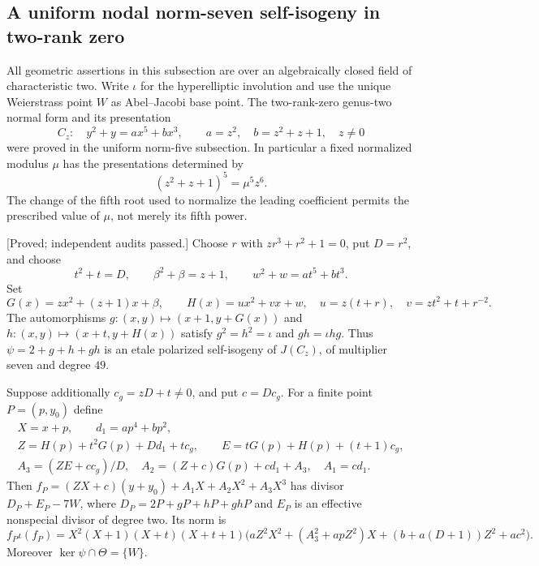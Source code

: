 \subsection{A uniform nodal norm-seven self-isogeny in two-rank zero}
\label{subsec:uniform-seven-theta-candidate}

All geometric assertions in this subsection are over an algebraically
closed field of characteristic two. Write $\iota$ for the hyperelliptic
involution and use the unique Weierstrass point $W$ as Abel--Jacobi base
point. The two-rank-zero genus-two normal form and its presentation
\[
 C_z:\quad y^2+y=ax^5+bx^3,\qquad
 a=z^2,\quad b=z^2+z+1,\quad z\ne0
 \tag{S7.1}
\]
were proved in the uniform norm-five subsection. In particular a fixed
normalized modulus $\mu$ has the presentations determined by
\[
             (z^2+z+1)^5=\mu^5z^6.                \tag{S7.2}
\]
The change of the fifth root used to normalize the leading coefficient
permits the prescribed value of $\mu$, not merely its fifth power.

\begin{lemma}
\label{lem:uniform-seven-interpolation-candidate}
\textup{[Proved; independent audits passed.]}
Choose $r$ with $zr^3+r^2+1=0$, put $D=r^2$, and choose
\[
 t^2+t=D,\qquad \beta^2+\beta=z+1,\qquad
 w^2+w=at^5+bt^3.
\]
Set
\[
 G(x)=zx^2+(z+1)x+\beta,\qquad
 H(x)=ux^2+vx+w,
 \quad u=z(t+r),\quad v=zt^2+t+r^{-2}.
\]
The automorphisms $g:(x,y)\mapsto(x+1,y+G(x))$ and
$h:(x,y)\mapsto(x+t,y+H(x))$ satisfy
$g^2=h^2=\iota$ and $gh=\iota hg$.
Thus $\psi=2+g+h+gh$ is an etale polarized self-isogeny of
$J(C_z)$, of multiplier seven and degree $49$.

Suppose additionally $c_g=zD+t\ne0$, and put $c=Dc_g$.
For a finite point $P=(p,y_0)$ define
\[
\begin{gathered}
 X=x+p,\qquad d_1=ap^4+bp^2,\\
 Z=H(p)+t^2G(p)+Dd_1+tc_g,\qquad
 E=tG(p)+H(p)+(t+1)c_g,\\
 A_3=(ZE+cc_g)/D,\quad
 A_2=(Z+c)G(p)+cd_1+A_3,\quad A_1=cd_1.
\end{gathered}
\]
Then $f_P=(ZX+c)(y+y_0)+A_1X+A_2X^2+A_3X^3$ has divisor
$D_P+E_P-7W$, where $D_P=2P+gP+hP+ghP$ and $E_P$ is an
effective nonspecial divisor of degree two. Its norm is
\[
 f_P\iota(f_P)=X^2(X+1)(X+t)(X+t+1)
 \bigl(aZ^2X^2+(A_3^2+apZ^2)X
              +(b+a(D+1))Z^2+ac^2\bigr).          \tag{S7.3}
\]
Moreover $\ker\psi\cap\Theta=\{W\}$.
\end{lemma}

